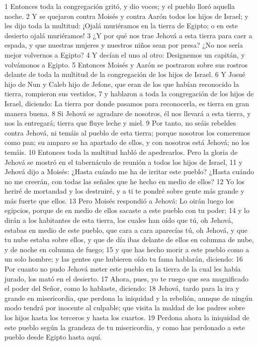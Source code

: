 1 Entonces toda la congregación gritó, y dio voces; y el pueblo lloró aquella noche.
2 Y se quejaron contra Moisés y contra Aarón todos los hijos de Israel; y les dijo toda la multitud: ¡Ojalá muriéramos en la tierra de Egipto; o en este desierto ojalá muriéramos!
3 ¿Y por qué nos trae Jehová a esta tierra para caer a espada, y que nuestras mujeres y nuestros niños sean por presa? ¿No nos sería mejor volvernos a Egipto?
4 Y decían el uno al otro: Designemos un capitán, y volvámonos a Egipto.
5 Entonces Moisés y Aarón se postraron sobre sus rostros delante de toda la multitud de la congregación de los hijos de Israel.
6 Y Josué hijo de Nun y Caleb hijo de Jefone, que eran de los que habían reconocido la tierra, rompieron sus vestidos,
7 y hablaron a toda la congregación de los hijos de Israel, diciendo: La tierra por donde pasamos para reconocerla, es tierra en gran manera buena.
8 Si Jehová se agradare de nosotros, él nos llevará a esta tierra, y nos la entregará; tierra que fluye leche y miel.
9 Por tanto, no seáis rebeldes contra Jehová, ni temáis al pueblo de esta tierra; porque nosotros los comeremos como pan; su amparo se ha apartado de ellos, y con nosotros está Jehová; no los temáis.
10 Entonces toda la multitud habló de apedrearlos. Pero la gloria de Jehová se mostró en el tabernáculo de reunión a todos los hijos de Israel,
11 y Jehová dijo a Moisés: ¿Hasta cuándo me ha de irritar este pueblo? ¿Hasta cuándo no me creerán, con todas las señales que he hecho en medio de ellos?
12 Yo los heriré de mortandad y los destruiré, y a ti te pondré sobre gente más grande y más fuerte que ellos.
13 Pero Moisés respondió a Jehová: Lo oirán luego los egipcios, porque de en medio de ellos sacaste a este pueblo con tu poder;
14 y lo dirán a los habitantes de esta tierra, los cuales han oído que tú, oh Jehová, estabas en medio de este pueblo, que cara a cara aparecías tú, oh Jehová, y que tu nube estaba sobre ellos, y que de día ibas delante de ellos en columna de nube, y de noche en columna de fuego;
15 y que has hecho morir a este pueblo como a un solo hombre; y las gentes que hubieren oído tu fama hablarán, diciendo:
16 Por cuanto no pudo Jehová meter este pueblo en la tierra de la cual les había jurado, los mató en el desierto.
17 Ahora, pues, yo te ruego que sea magnificado el poder del Señor, como lo hablaste, diciendo: 
18 Jehová, tardo para la ira y grande en misericordia, que perdona la iniquidad y la rebelión, aunque de ningún modo tendrá por inocente al culpable; que visita la maldad de los padres sobre los hijos hasta los terceros y hasta los cuartos.
19 Perdona ahora la iniquidad de este pueblo según la grandeza de tu misericordia, y como has perdonado a este pueblo desde Egipto hasta aquí. 

